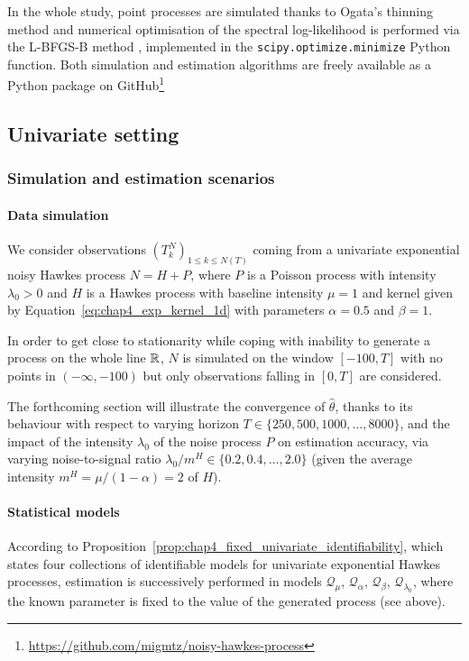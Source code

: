   In the whole study, point processes are simulated thanks to Ogata's thinning method \parencite{Ogata1981}
  and numerical optimisation of the spectral log-likelihood is performed via the L-BFGS-B method \parencite{Byrd1995}, implemented in the \texttt{scipy.optimize.minimize} Python function.
  Both simulation and estimation algorithms are freely available as a Python package on GitHub\footnote{\url{https://github.com/migmtz/noisy-hawkes-process}}
        
  \subsection{Univariate setting}\label{sec:chap4_univariate_numerical_results}


    \subsubsection{Simulation and estimation scenarios}\label{sec:chap4_uni_simulation}
      \paragraph{Data simulation}
        We consider observations $(T_k^N)_{1 \le k \le N(T)}$ coming from a univariate exponential noisy Hawkes process $N = H+P$,
        where $P$ is a Poisson process with intensity $\lambda_0 > 0$
        and $H$ is a Hawkes process with baseline intensity $\mu = 1$ and kernel given by Equation~\eqref{eq:chap4_exp_kernel_1d}
        with parameters $\alpha=0.5$ and $\beta=1$.

        In order to get close to stationarity while coping with inability to generate a process on the whole line ${\mathbb R}$,
        $N$ is simulated on the window $[-100, T]$ with no points in $(-\infty, -100)$
        but only observations falling in $[0, T]$ are considered.
        
        The forthcoming section will illustrate the convergence of $\hat \theta$,
        thanks to its behaviour with respect to varying horizon $T \in \{250, 500, 1000, \dots, 8000\}$,
        and the impact of the intensity $\lambda_0$ of the noise process $P$ on estimation accuracy,
        via varying noise-to-signal ratio ${\lambda_0}/{m^H} \in \{ 0.2, 0.4, \dots, 2.0 \}$
        (given the average intensity $m^H = {\mu}/{(1-\alpha)}=2$ of $H$).
        

      \paragraph{Statistical models}
        According to Proposition~\ref{prop:chap4_fixed_univariate_identifiability},
        which states four collections of identifiable models for univariate exponential Hawkes processes,
        estimation is successively performed in models $\mathcal Q_{\mu}$, $\mathcal Q_{\alpha}$, $\mathcal Q_{\beta}$, $\mathcal Q_{\lambda_0}$,
        where the known parameter is fixed to the value of the generated process (see above).
        
